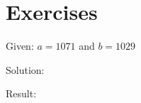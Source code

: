 \documentclass[a4paper, 10pt]{scrartcl}
\begin{document}
\section{Exercises}

Given: $a = 1071$ and $b = 1029$

Solution:

Result:
\end{document}
